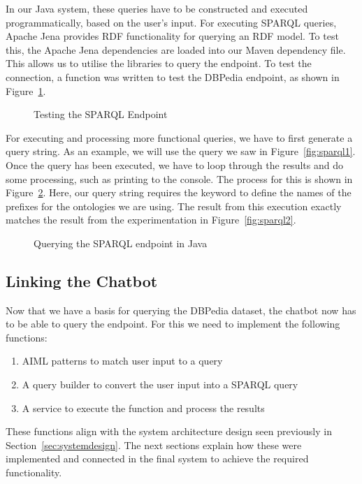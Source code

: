 In our Java system, these queries have to be constructed and executed programmatically, based on the user's input. For executing SPARQL queries, Apache Jena \cite{apachejena} provides RDF functionality for querying an RDF model. To test this, the Apache Jena dependencies are loaded into our Maven dependency file. This allows us to utilise the  libraries to query the endpoint. To test the connection, a function was written to test the DBPedia endpoint, as shown in Figure~\ref{fig:testrdf}.

\begin{figure}[h]
	\centering
	\qquad
	\caption{Testing the SPARQL Endpoint}
	\label{fig:testrdf}
\end{figure}

For executing and processing more functional queries, we have to first generate a query string. As an example, we will use the query we saw in Figure~\ref{fig:sparql1}. Once the query has been executed, we have to loop through the results and do some processing, such as printing to the console. The process for this is shown in Figure~\ref{fig:querysparql}. Here, our query string requires the  keyword to define the names of the prefixes for the ontologies we are using. The result from this execution exactly matches the result from the experimentation in Figure~\ref{fig:sparql2}.

\begin{figure}[h]
	\centering
	\qquad
	\caption{Querying the SPARQL endpoint in Java}
	\label{fig:querysparql}
\end{figure}

\subsection{Linking the Chatbot}
Now that we have a basis for querying the DBPedia dataset, the chatbot now has to be able to query the endpoint. For this we need to implement the following functions:
\begin{enumerate}
	\item AIML patterns to match user input to a query
	\item A query builder to convert the user input into a SPARQL query
	\item A service to execute the function and process the results
\end{enumerate}
These functions align with the system architecture design seen previously in Section~\ref{sec:systemdesign}. The next sections explain how these were implemented and connected in the final system to achieve the required functionality.

